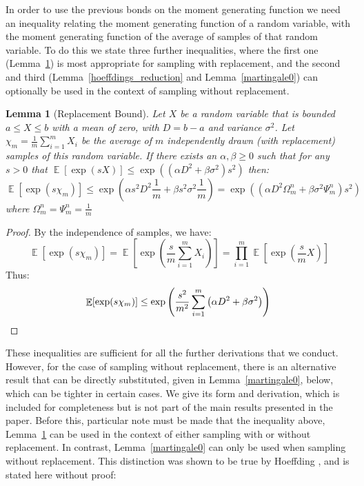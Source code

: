 \documentclass[]{interact}
\DeclareMathOperator{\E}{\mathbb{E}}
\theoremstyle{plain}%
\newtheorem{lemma}[Theorem]{Lemma}
\theoremstyle{definition}
\theoremstyle{remark}
\begin{document}
In order to use the previous bonds on the moment generating function we need an inequality relating the moment generating function of a random variable, with the moment generating function of the average of samples of that random variable.
To do this we state three further inequalities, where the first one (Lemma~\ref{martingale1}) is most appropriate for sampling with replacement, and the second and third (Lemma~\ref{hoeffdings_reduction} and Lemma~\ref{martingale0}) can optionally be used in the context of sampling without replacement.

\begin{lemma}[Replacement Bound]\label{martingale1}
Let $X$ be a random variable that is bounded $a\le X\le b$ with a mean of zero, with $D=b-a$ and variance $\sigma^2$.
Let $\chi_m = \frac{1}{m}\sum_{i=1}^mX_i$ be the average of $m$ independently drawn (with replacement) samples of this random variable.
If there exists an $\alpha, \beta \ge 0$ such that for any $s>0$ that $\E[\exp(sX)]\le\exp((\alpha D^2 +\beta \sigma^2) s^2)$ then:
$$\textstyle\E[\exp(s\chi_m)]\le\exp(\alpha s^2D^2\frac{1}{m} +\beta s^2\sigma^2 \frac{1}{m}) = \exp((\alpha D^2{\Omega}_m^n +\beta\sigma^2 {\Psi}_m^n)s^2)$$
where ${\Omega}_m^n = {\Psi}_m^n = \frac{1}{m}$
\end{lemma}
\begin{proof} 
By the independence of samples, we have:
\[\E[\exp(s\chi_m)]=\E\left[\exp\left(\frac{s}{m}\sum_{i=1}^mX_i\right)\right]=\prod_{i=1}^m\E\left[\exp\left(\frac{s}{m}X\right)\right]\] 
Thus:
\[\E[\exp(s\chi_m)] \le \exp\left(\frac{s^2}{m^2}\sum_{i=1}^m\left(\alpha D^2 +\beta \sigma^2\right) \right) \qedhere\]
\end{proof}

These inequalities are sufficient for all the further derivations that we conduct. 
However, for the case of sampling without replacement, 
there is an alternative result that can be directly substituted, given in Lemma~\ref{martingale0}, below, which can be tighter in certain cases. 
We give its form and derivation, which is included for completeness but is not part of the main results presented in the paper.
Before this, particular note must be made that the inequality above, Lemma~\ref{martingale1} can be used in the context of either sampling with or without replacement.
In contrast, Lemma~\ref{martingale0} can only be used when sampling without replacement. 
This distinction was shown to be true by Hoeffding \cite{hoeffding1}, 
and is stated here without proof:
\end{document}
